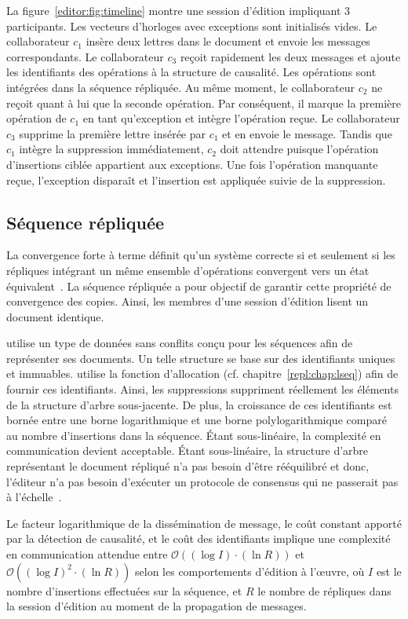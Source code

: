 La figure~\ref{editor:fig:timeline} montre une session d'édition impliquant 3
participants. Les vecteurs d'horloges avec exceptions sont initialisés vides. Le
collaborateur $c_1$ insère deux lettres dans le document et envoie les messages
correspondants. Le collaborateur $c_3$ reçoit rapidement les deux messages et
ajoute les identifiants des opérations à la structure de causalité. Les
opérations sont intégrées dans la séquence répliquée. Au même moment, le
collaborateur $c_2$ ne reçoit quant à lui que la seconde opération. Par
conséquent, il marque la première opération de $c_1$ en tant qu'exception et
intègre l'opération reçue. Le collaborateur $c_3$ supprime la première lettre
insérée par $c_1$ et en envoie le message. Tandis que $c_1$ intègre la
suppression immédiatement, $c_2$ doit attendre puisque l'opération d'insertions
ciblée appartient aux exceptions. Une fois l'opération manquante reçue,
l'exception disparaît et l'insertion est appliquée suivie de la suppression.

\subsection{Séquence répliquée}

La convergence forte à terme définit qu'un système correcte si et seulement si
les répliques intégrant un même ensemble d'opérations convergent vers un état
équivalent~\cite{shapiro2011conflict}. La séquence répliquée a pour objectif de
garantir cette propriété de convergence des copies. Ainsi, les membres d'une
session d'édition lisent un document identique.

\CRATE utilise un type de données sans conflits conçu pour les
séquences afin de représenter ses documents. Un telle structure se base sur des
identifiants uniques et immuables. \CRATE utilise la fonction d'allocation \LSEQ
(cf. chapitre~\ref{repl:chap:lseq}) afin de fournir ces identifiants. Ainsi, les
suppressions suppriment réellement les éléments de la structure d'arbre
sous-jacente. De plus, la croissance de ces identifiants est bornée entre une
borne logarithmique et une borne polylogarithmique comparé au nombre
d'insertions dans la séquence. Étant sous-linéaire, la complexité en
communication devient acceptable. Étant sous-linéaire, la structure d'arbre
représentant le document répliqué n'a pas besoin d'être rééquilibré et donc,
l'éditeur n'a pas besoin d'exécuter un protocole de consensus qui ne passerait
pas à l'échelle~\cite{mostefaoui2015signature}.

Le facteur logarithmique de la dissémination de message, le coût constant
apporté par la détection de causalité, et le coût des identifiants implique une
complexité en communication attendue entre $\mathcal{O}((\log I)\cdot (\ln R))$ et
$\mathcal{O}((\log I)^2\cdot(\ln R))$ selon les comportements d'édition à l'œuvre,
où $I$ est le nombre d'insertions effectuées sur la séquence, et $R$ le nombre
de répliques dans la session d'édition au moment de la propagation de messages.



